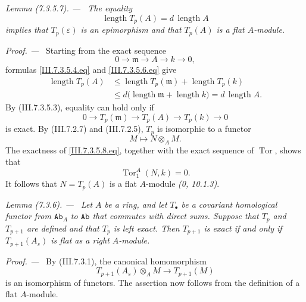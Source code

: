 \documentclass[10pt,oneside]{book}
\newcommand{\cat}[1]{\mathtt{#1}}
\newcommand{\Tor}{\operatorname{Tor}}
\newcommand{\sref}[2][]{(#2)}
\newenvironment{lemma}[1][]{\par\medskip\noindent\itshape Lemma (#1). ---\ }{\par}
\newenvironment{proof}{\par\medskip\noindent\textit{Proof. ---\ }}{\par}
\begin{document}
\begin{lemma}[7.3.5.7]
\label{III.7.3.5.7}
The equality
\[
  \operatorname{length}T_p(A)
  =
  d\,\operatorname{length}A
\]
implies that $T_p(\varepsilon)$ is an epimorphism and that
$T_p(A)$ is a flat $A$-module.
\end{lemma}

\begin{proof}
Starting from the exact sequence
\[
  0\longrightarrow\mathfrak m
  \longrightarrow A
  \longrightarrow k
  \longrightarrow0,
\]
formulas \eqref{III.7.3.5.4.eq} and
\eqref{III.7.3.5.6.eq} give
\[
  \begin{split}
  \operatorname{length}T_p(A)
  &\leq
  \operatorname{length}T_p(\mathfrak m)
  +
  \operatorname{length}T_p(k)
  \\
  &\leq
  d\bigl(
    \operatorname{length}\mathfrak m
    +
    \operatorname{length}k
  \bigr)
  =
  d\,\operatorname{length}A.
  \end{split}
\]
By \sref{III.7.3.5.3}, equality can hold only if
\[
  0\longrightarrow T_p(\mathfrak m)
  \longrightarrow T_p(A)
  \longrightarrow T_p(k)
  \longrightarrow0
  \tag{7.3.5.8}\label{III.7.3.5.8.eq}
\]
is exact.  By \sref{III.7.2.7} and \sref{III.7.2.5}, $T_p$ is
isomorphic to a functor
\[
  M\longmapsto N\otimes_A M.
\]
The exactness of \eqref{III.7.3.5.8.eq}, together with the exact
sequence of $\Tor$, shows that
\[
  \Tor^A_1(N,k)=0.
\]
It follows that $N=T_p(A)$ is a flat $A$-module
\emph{(0, 10.1.3)}.
\end{proof}

\begin{lemma}[7.3.6]
\label{III.7.3.6}
Let $A$ be a ring, and let $T_\bullet$ be a covariant
homological functor from $\cat{Ab}_A$ to $\cat{Ab}$ that
commutes with direct sums.  Suppose that $T_p$ and $T_{p+1}$
are defined and that $T_p$ is left exact.  Then $T_{p+1}$ is
exact if and only if $T_{p+1}(A_s)$ is flat as a right
$A$-module.
\end{lemma}

\begin{proof}
By \sref{III.7.3.1}, the canonical homomorphism
\[
  T_{p+1}(A_s)\otimes_A M
  \longrightarrow
  T_{p+1}(M)
\]
is an isomorphism of functors.  The assertion now follows from
the definition of a flat $A$-module.
\end{proof}
\end{document}
